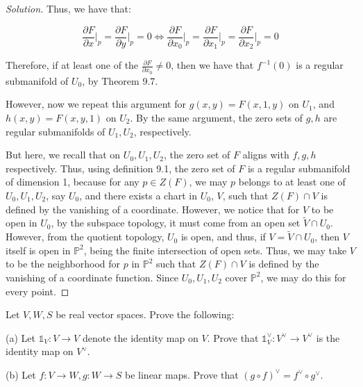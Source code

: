 \documentclass[10pt]{article}
\newenvironment{problem}[2][]{\begin{trivlist}
\item[\hskip \labelsep {\bfseries #1}\hskip \labelsep {\bfseries #2.}]}{\end{trivlist}}
\begin{document}
\begin{proof}[Solution]
Thus, we have that:

$$ \frac{\partial F}{\partial x}\bigg|_{p}= \frac{\partial F}{\partial y}\bigg|_{p} = 0 \iff  \frac{\partial F}{\partial x_0}\bigg|_{p} =  \frac{\partial F}{\partial x_1}\bigg|_{p}= \frac{\partial F}{\partial x_2}\bigg|_{p} = 0$$

Therefore, if at least one of the $\frac{\partial F}{\partial x_0} \not = 0$, then we have that $f^{-1}(0)$ is a regular submanifold of $U_0$, by Theorem 9.7.

However, now we repeat this argument for $g(x,y) = F(x,1,y)$ on $U_1$, and $h(x,y) = F(x,y,1)$ on $U_2$. By the same argument, the zero sets of $g, h$ are regular submanifolds of $U_1, U_2$, respectively.

But here, we recall that on $U_0, U_1, U_2$, the zero set of $F$ aligns with $f, g, h$ respectively. Thus, using definition 9.1, the zero set of $F$ is a regular submanifold of dimension 1, because for any $p \in Z(F)$, we may $p$ belongs to at least one of $U_0, U_1, U_2$, say $U_0$, and there exists a chart in $U_0$, $V$, such that $Z(F) \cap V$ is defined by the vanishing of a coordinate. However, we notice that for $V$ to be open in $U_0$, by the subspace topology, it must come from an open set $\tilde{V} \cap U_0$. However, from the quotient topology, $U_0$ is open, and thus, if $V = \tilde{V} \cap U_0$, then $V$ itself is open in $\mathbb{P}^2$, being the finite intersection of open sets. Thus, we may take $V$ to be the neighborhood for $p$ in $\mathbb{P}^2$ such that $Z(F) \cap V$ is defined by the vanishing of a coordinate function. Since $U_0,U_1, U_2$ cover $\mathbb{P}^2$, we may do this for every point.







\end{proof}

\begin{problem}{Question 4}

Let $V, W, S$ be real vector spaces. Prove the following:

(a) Let $\mathds{1}_V: V \to V$ denote the identity map on $V$. Prove that $\mathds{1}^\vee_V: V^\vee \to V^\vee$ is the identity map on $V^\vee$.

(b) Let $f: V \to W, g: W \to S$ be linear maps. Prove that $(g \circ f)^\vee  = f^\vee \circ g^\vee $.

\end{problem}
\end{document}
